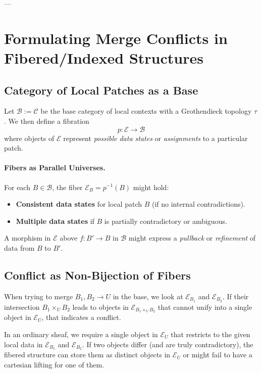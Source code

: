 \documentclass{article}
\begin{document}
---

\section{Formulating Merge Conflicts in Fibered/Indexed Structures}
\label{sec:fibered_merges}

\subsection{Category of Local Patches as a Base}
Let $\mathcal{B} := \mathcal{C}$ be the base category of local contexts with a Grothendieck topology $\tau$. We then define a fibration
\[
p: \mathcal{E} \longrightarrow \mathcal{B}
\]
where objects of $\mathcal{E}$ represent \emph{possible data states} or \emph{assignments} to a particular patch.

\paragraph{Fibers as Parallel Universes.}
For each $B \in \mathcal{B}$, the fiber $\mathcal{E}_B = p^{-1}(B)$ might hold:
\begin{itemize}
    \item \textbf{Consistent data states} for local patch $B$ (if no internal contradictions).
    \item \textbf{Multiple data states} if $B$ is partially contradictory or ambiguous.
\end{itemize}

A morphism in $\mathcal{E}$ above $f: B' \to B$ in $\mathcal{B}$ might express a \emph{pullback} or \emph{refinement} of data from $B$ to $B'$.

\subsection{Conflict as Non-Bijection of Fibers}
When trying to merge $B_1, B_2 \to U$ in the base, we look at $\mathcal{E}_{B_1}$ and $\mathcal{E}_{B_2}$. If their intersection $B_1 \times_U B_2$ leads to objects in $\mathcal{E}_{B_1 \times_U B_2}$ that cannot unify into a single object in $\mathcal{E}_U$, that indicates a conflict.

In an ordinary sheaf, we require a single object in $\mathcal{E}_U$ that restricts to the given local data in $\mathcal{E}_{B_1}$ and $\mathcal{E}_{B_2}$. If two objects differ (and are truly contradictory), the fibered structure can store them as distinct objects in $\mathcal{E}_U$ or might fail to have a cartesian lifting for one of them.
\end{document}
